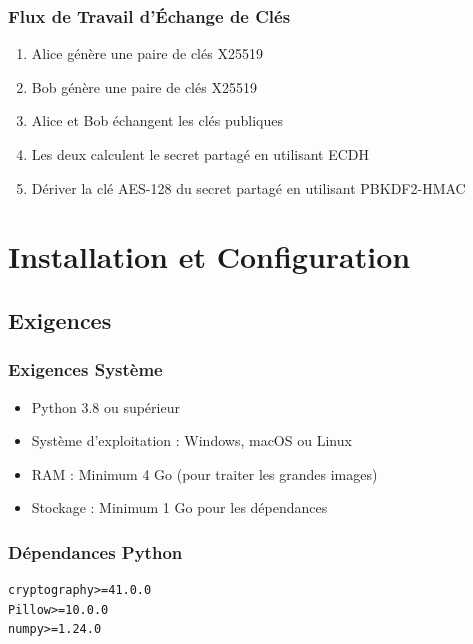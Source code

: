 \documentclass[12pt,a4paper]{report}
\begin{document}
\subsection{Flux de Travail d'Échange de Clés}

\begin{enumerate}
    \item Alice génère une paire de clés X25519
    \item Bob génère une paire de clés X25519
    \item Alice et Bob échangent les clés publiques
    \item Les deux calculent le secret partagé en utilisant ECDH
    \item Dériver la clé AES-128 du secret partagé en utilisant PBKDF2-HMAC
\end{enumerate}

\chapter{Installation et Configuration}

\section{Exigences}

\subsection{Exigences Système}
\begin{itemize}
    \item Python 3.8 ou supérieur
    \item Système d'exploitation : Windows, macOS ou Linux
    \item RAM : Minimum 4 Go (pour traiter les grandes images)
    \item Stockage : Minimum 1 Go pour les dépendances
\end{itemize}

\subsection{Dépendances Python}

\begin{lstlisting}[caption=requirements.txt]
cryptography>=41.0.0
Pillow>=10.0.0
numpy>=1.24.0
\end{lstlisting}
\end{document}
